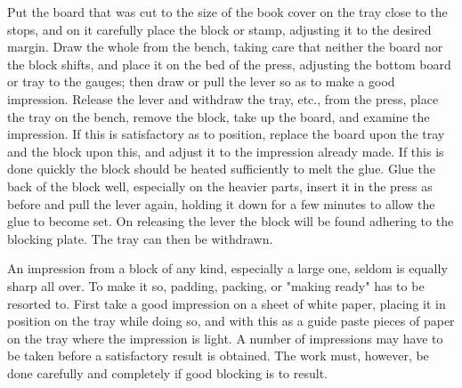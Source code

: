 \documentclass[twoside]{book}
\begin{document}
Put the board that was cut to the size of the
\pagebreak
book cover on the tray close to the stops, and on it
carefully place the block or stamp, adjusting it to
the desired margin. Draw the whole from the
bench, taking care that neither the board nor the
block shifts, and place it on the bed of the press,
adjusting the bottom board or tray to the gauges;
then draw or pull the lever so as to make a good
impression. Release the lever and withdraw the
tray, etc., from the press, place the tray on the
bench, remove the block, take up the board, and
examine the impression. If this is satisfactory as to
position, replace the board upon the tray and the
block upon this, and adjust it to the impression
already made. If this is done quickly the block
should be heated sufficiently to melt the glue. Glue
the back of the block well, especially on the heavier
parts, insert it in the press as before and pull the
lever again, holding it down for a few minutes to
allow the glue to become set. On releasing the
lever the block will be found adhering to the blocking
plate. The tray can then be withdrawn.

An impression from a block of any kind, especially
a large one, seldom is equally sharp all over.
To make it so, padding, packing, or "making ready"
has to be resorted to. First take a good impression
on a sheet of white paper, placing it in position on
the tray while doing so, and with this as a guide
paste pieces of paper on the tray where the impression
is light. A number of impressions may have to
be taken before a satisfactory result is obtained.
The work must, however, be done carefully and
completely if good blocking is to result.
\end{document}
